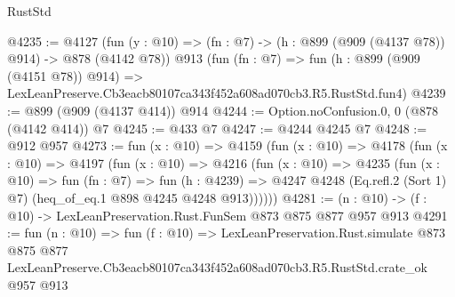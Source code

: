 \begin{lexlean}{RustStd}
\begin{coremodule}
@4235 := @4127
    (fun (y : @10) => (fn : @7) -> (h : @899 (@909 (@4137 @78)) @914) -> @878 (@4142 @78))
    @913
    (fun (fn : @7) =>
    fun (h : @899 (@909 (@4151 @78)) @914) =>
    LexLeanPreserve.Cb3eacb80107ca343f452a608ad070cb3.R5.RustStd.fun4)
@4239 := @899 (@909 (@4137 @414)) @914
@4244 := Option.noConfusion.{0, 0} (@878 (@4142 @414)) @7
@4245 := @433 @7
@4247 := @4244 @4245 @7
@4248 := @912 @957
@4273 := fun (x : @10) =>
  @4159
    (fun (x : @10) =>
    @4178
      (fun (x : @10) =>
      @4197
        (fun (x : @10) =>
        @4216
          (fun (x : @10) =>
          @4235
            (fun (x : @10) =>
            fun (fn : @7) =>
            fun (h : @4239) =>
            @4247 @4248 (Eq.refl.{2} (Sort 1) @7) (heq_of_eq.{1} @898 @4245 @4248 @913))))))
@4281 := (n : @10) -> (f : @10) -> LexLeanPreservation.Rust.FunSem @873 @875 @877 @957 @913
@4291 := fun (n : @10) =>
  fun (f : @10) =>
  LexLeanPreservation.Rust.simulate
    @873
    @875
    @877
    LexLeanPreserve.Cb3eacb80107ca343f452a608ad070cb3.R5.RustStd.crate_ok
    @957
    @913
\end{coremodule}
\end{lexlean}
